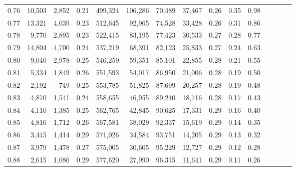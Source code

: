 \begin{tabular}{rrrcrrrrrrrrrrr}
0.76 &  10,503 &  2,852 &                                       0.21 &  499,324 &  106,286 &   70,489 &   37,467 &  0.26 &  0.35 &                         0.98 \\
0.77 &  13,321 &  4,039 &                                       0.23 &  512,645 &   92,965 &   74,528 &   33,428 &  0.26 &  0.31 &                         0.86 \\
0.78 &   9,770 &  2,895 &                                       0.23 &  522,415 &   83,195 &   77,423 &   30,533 &  0.27 &  0.28 &                         0.77 \\
0.79 &  14,804 &  4,700 &                                       0.24 &  537,219 &   68,391 &   82,123 &   25,833 &  0.27 &  0.24 &                         0.63 \\
0.80 &   9,040 &  2,978 &                                       0.25 &  546,259 &   59,351 &   85,101 &   22,855 &  0.28 &  0.21 &                         0.55 \\
0.81 &   5,334 &  1,849 &                                       0.26 &  551,593 &   54,017 &   86,950 &   21,006 &  0.28 &  0.19 &                         0.50 \\
0.82 &   2,192 &    749 &                                       0.25 &  553,785 &   51,825 &   87,699 &   20,257 &  0.28 &  0.19 &                         0.48 \\
0.83 &   4,870 &  1,541 &                                       0.24 &  558,655 &   46,955 &   89,240 &   18,716 &  0.28 &  0.17 &                         0.43 \\
0.84 &   4,110 &  1,385 &                                       0.25 &  562,765 &   42,845 &   90,625 &   17,331 &  0.29 &  0.16 &                         0.40 \\
0.85 &   4,816 &  1,712 &                                       0.26 &  567,581 &   38,029 &   92,337 &   15,619 &  0.29 &  0.14 &                         0.35 \\
0.86 &   3,445 &  1,414 &                                       0.29 &  571,026 &   34,584 &   93,751 &   14,205 &  0.29 &  0.13 &                         0.32 \\
0.87 &   3,979 &  1,478 &                                       0.27 &  575,005 &   30,605 &   95,229 &   12,727 &  0.29 &  0.12 &                         0.28 \\
0.88 &   2,615 &  1,086 &                                       0.29 &  577,620 &   27,990 &   96,315 &   11,641 &  0.29 &  0.11 &                         0.26 \\

\end{tabular}
